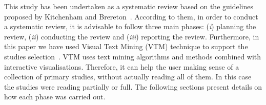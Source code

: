 This study has been undertaken as a systematic review based on the guidelines proposed by Kitchenham and Brereton~\cite{Kitchenham}. According to them, in order to conduct a systematic review, it is advisable to follow three main phases: (\textit{i}) planning the review, (\textit{ii}) conducting the review and (\textit{iii}) reporting the review. %
Furthermore, in this paper we have used Visual Text Mining (VTM) technique to support the studies selection~\cite{Malheiros:2007}. VTM uses text mining algorithms and methods combined with interactive visualisations. Therefore, it can help the user making sense of a collection of primary studies, without actually reading all of them. In this case the studies were reading partially or full. The following sections present details on how each phase was carried out.

